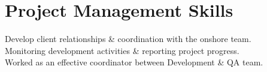 \documentclass[]{deedy-resume-openfont}
\begin{document}
\begin{minipage}[t]{0.66\textwidth}


\section{Project Management Skills} 
\textbullet{} Develop client relationships \& coordination with the onshore team.\\
\textbullet{} Monitoring development activities \& reporting project progress.\\
\textbullet{} Worked as an effective coordinator between Development \& QA team.


\end{minipage} 
\newpage
\end{document}
